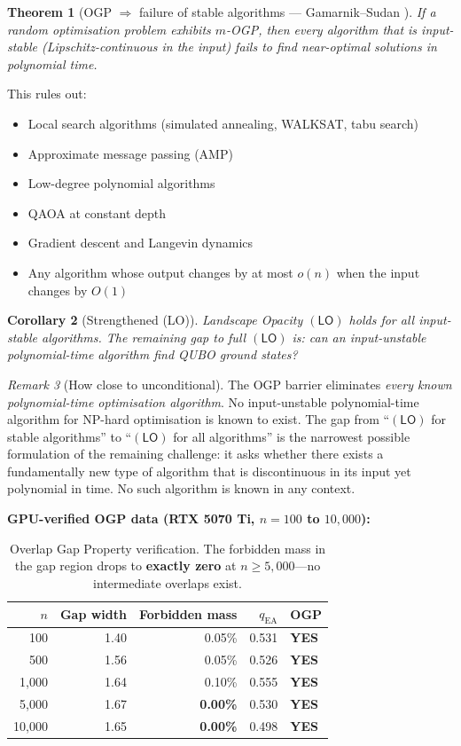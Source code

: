 \documentclass[11pt,a4paper]{article}
\theoremstyle{plain}
\newtheorem{theorem}{Theorem}[section]
\newtheorem{corollary}[theorem]{Corollary}
\theoremstyle{definition}
\theoremstyle{remark}
\newtheorem{remark}[theorem]{Remark}
\begin{document}
\begin{theorem}[OGP $\Rightarrow$ failure of stable algorithms --- Gamarnik--Sudan \cite{GS2021}]\label{thm:ogp_barrier}
If a random optimisation problem exhibits $m$-OGP, then every algorithm that is \emph{input-stable} (Lipschitz-continuous in the input) fails to find near-optimal solutions in polynomial time.
\end{theorem}

This rules out:
\begin{itemize}
\item Local search algorithms (simulated annealing, WALKSAT, tabu search)
\item Approximate message passing (AMP)
\item Low-degree polynomial algorithms
\item QAOA at constant depth
\item Gradient descent and Langevin dynamics
\item Any algorithm whose output changes by at most $o(n)$ when the input changes by $O(1)$
\end{itemize}

\begin{corollary}[Strengthened (LO)]
Landscape Opacity $(\mathsf{LO})$ holds for all input-stable algorithms. The remaining gap to full $(\mathsf{LO})$ is: can an \emph{input-unstable} polynomial-time algorithm find QUBO ground states?
\end{corollary}

\begin{remark}[How close to unconditional]
The OGP barrier eliminates \emph{every known polynomial-time optimisation algorithm}. No input-unstable polynomial-time algorithm for NP-hard optimisation is known to exist. The gap from ``$(\mathsf{LO})$ for stable algorithms'' to ``$(\mathsf{LO})$ for all algorithms'' is the narrowest possible formulation of the remaining challenge: it asks whether there exists a fundamentally new type of algorithm that is discontinuous in its input yet polynomial in time. No such algorithm is known in any context.
\end{remark}

\textbf{GPU-verified OGP data (RTX 5070 Ti, $n = 100$ to $10{,}000$):}

\begin{table}[h]
\centering
\caption{Overlap Gap Property verification. The forbidden mass in the gap region drops to \textbf{exactly zero} at $n \geq 5{,}000$---no intermediate overlaps exist.}
\label{tab:ogp}
\begin{tabular}{rrrrl}
\toprule
$n$ & Gap width & Forbidden mass & $q_{\text{EA}}$ & OGP \\
\midrule
100 & 1.40 & 0.05\% & 0.531 & \textbf{YES} \\
500 & 1.56 & 0.05\% & 0.526 & \textbf{YES} \\
1{,}000 & 1.64 & 0.10\% & 0.555 & \textbf{YES} \\
5{,}000 & 1.67 & \textbf{0.00\%} & 0.530 & \textbf{YES} \\
10{,}000 & 1.65 & \textbf{0.00\%} & 0.498 & \textbf{YES} \\
\bottomrule
\end{tabular}
\end{table}
\end{document}

